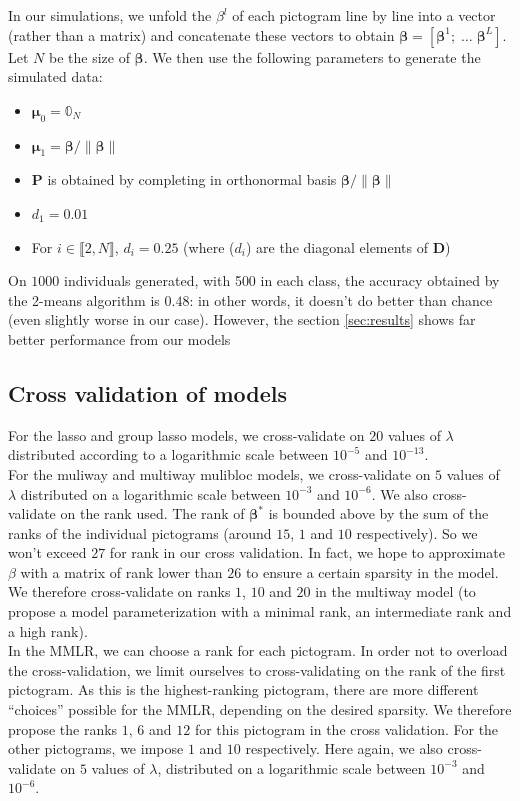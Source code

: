 \documentclass[preprint,12pt]{elsarticle}
\begin{document}
\noindent In our simulations, we unfold the $\beta^l$ of each pictogram line by line into a vector (rather than a matrix) and concatenate these vectors to obtain $\bm{\beta} = [\bm{\beta}^1; \; \hdots \; \bm{\beta}^L]$. Let $N$ be the size of $\bm{\beta}$. We then use the following parameters to generate the simulated data:
\begin{itemize}[label = $\bullet$]
    \item $\bm{\mu}_0 = \mathbb{0}_N$
    \item $\bm{\mu}_1 = \bm{\beta}/\lVert \bm{\beta}\rVert$ 
    \item $\mathbf{P}$ is obtained by completing in orthonormal basis $\bm{\beta}/\lVert \bm{\beta}\rVert$
    \item $d_1 = 0.01$
    \item For $i \in \llbracket 2, N \rrbracket$, $d_i = 0.25$ (where ($d_i$) are the diagonal elements of $\mathbf{D}$) 
\end{itemize}

On $1000$ individuals generated, with 500 in each class, the accuracy obtained by the 2-means algorithm is $0.48$: in other words, it doesn't do better than chance (even slightly worse in our case). However, the section \ref{sec:results} shows far better performance from our models

\subsection{Cross validation of models}

\noindent For the lasso and group lasso models, we cross-validate on $20$ values of $\lambda$ distributed according to a logarithmic scale between $10^{-5}$ and $10^{-13}$.\\
\indent For the muliway and multiway mulibloc models, we cross-validate on $5$ values of $\lambda$ distributed on a logarithmic scale between $10^{-3}$ and $10^{-6}$. We also cross-validate on the rank used. The rank of $\bm{\beta}^*$ is bounded above by the sum of the ranks of the individual pictograms (around $15$, $1$ and $10$ respectively). So we won't exceed $27$ for rank in our cross validation. In fact, we hope to approximate $\beta$ with a matrix of rank lower than $26$ to ensure a certain sparsity in the model. We therefore cross-validate on ranks $1$, $10$ and $20$ in the multiway model (to propose a model parameterization with a minimal rank, an intermediate rank and a high rank).\\
\indent In the MMLR, we can choose a rank for each pictogram. In order not to overload the cross-validation, we limit ourselves to cross-validating on the rank of the first pictogram. As this is the highest-ranking pictogram, there are more different “choices” possible for the MMLR, depending on the desired sparsity. We therefore propose the ranks $1$, $6$ and $12$ for this pictogram in the cross validation. For the other pictograms, we impose $1$ and $10$ respectively. Here again, we also cross-validate on $5$ values of $\lambda$, distributed on a logarithmic scale between $10^{-3}$ and $10^{-6}$.
\end{document}
